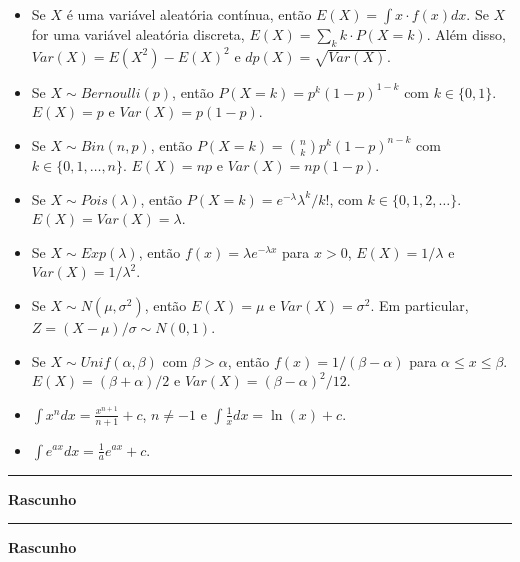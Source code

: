 \documentclass{article}
\begin{document}
\begin{small}
\begin{itemize}
\item Se $X$ é uma variável aleatória contínua, então $E(X) = \int x \cdot f(x)dx$. Se $X$ for uma variável aleatória discreta, $E(X) = \sum_k  k \cdot P(X=k)$.  Além disso, $Var(X) = E(X^2) - E(X)^2$ e $dp(X) = \sqrt{Var(X)}$.
\item Se $X\sim Bernoulli(p)$, então $P(X=k) = p^k (1 - p)^{1 - k}$ com $k\in\{0, 1\}$. $E(X) = p$ e $Var(X) = p(1 - p)$.
\item Se $X\sim Bin(n, p)$, então $P(X=k) = \binom{n}{k} p^k (1 - p)^{n - k}$ com $k\in\{0, 1, \ldots, n\}$. $E(X) = n p$ e $Var(X) = n p(1 - p)$.
\item Se $X\sim Pois(\lambda)$, então $P(X=k)=e^{-\lambda}\lambda^k/k!$, com $k\in\{0,1,2,\ldots\}$. $E(X)=Var(X)=\lambda$.
\item Se $X\sim Exp(\lambda)$, então $f(x) = \lambda e^{-\lambda x}$ para $x>0$, $E(X) = 1/\lambda$ e $Var(X) = 1/\lambda^2$.
\item Se $X\sim N(\mu, \sigma^2)$, então $E(X) = \mu$ e $Var(X) = \sigma^2$. Em particular, $Z = (X - \mu)/\sigma \sim N(0,1)$.
\item Se $X\sim Unif(\alpha, \beta)$ com $\beta>\alpha$, então $f(x)=1/(\beta - \alpha)$ para $\alpha\leq x \leq \beta$. $E(X) = (\beta + \alpha)/2$ e $Var(X) = (\beta - \alpha)^2/12$.
\item $\int x^n dx = \frac{x^{n+1}}{n+1} + c$, $n\neq -1$ e $\int \frac{1}{x} dx = \ln(x) + c$.
\item $\int e^{ax} dx = \frac{1}{a} e^{ax} + c$.	
\end{itemize}
\end{small}


\newpage
\begin{center}
	\noindent\rule{15cm}{0.4pt}
	\Large{\textbf{Rascunho}}
\end{center}

\newpage
\begin{center}
	\noindent\rule{15cm}{0.4pt}
	\Large{\textbf{Rascunho}}
\end{center}
\end{document}
